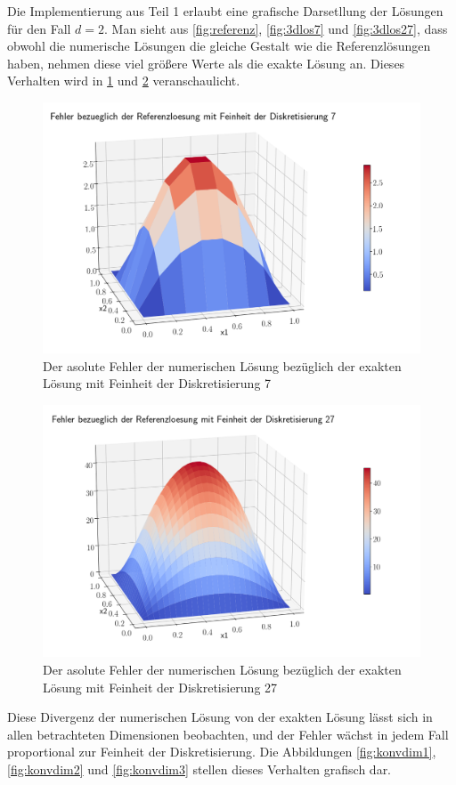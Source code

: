 \documentclass[smallheadings]{scrartcl}
\numberwithin{equation}{section}
\begin{document}
Die Implementierung aus Teil 1 erlaubt eine grafische Darsetllung der Lösungen für den Fall $d=2$. Man sieht aus \ref{fig:referenz}, \ref{fig:3dlos7} und \ref{fig:3dlos27}, dass obwohl die numerische Lösungen die gleiche Gestalt wie die Referenzlösungen haben, nehmen diese viel größere Werte als die exakte Lösung an. Dieses Verhalten wird in \ref{fig:3dfel7} und \ref{fig:3dfel27} veranschaulicht. 

\begin{figure}
	\centering
	\includegraphics[width=0.7\linewidth]{Bericht/Bilder/3dfeh7}
	\caption{Der asolute Fehler der numerischen Lösung bezüglich der exakten Lösung mit Feinheit der Diskretisierung 7}
	\label{fig:3dfel7}
\end{figure}

\begin{figure}
	\centering
	\includegraphics[width=0.7\linewidth]{Bericht/Bilder/3dfel27}
	\caption{Der asolute Fehler der numerischen Lösung bezüglich der exakten Lösung mit Feinheit der Diskretisierung 27}
	\label{fig:3dfel27}
\end{figure}

Diese Divergenz der numerischen Lösung von der exakten Lösung lässt sich in allen betrachteten Dimensionen beobachten, und der Fehler wächst in jedem Fall proportional zur Feinheit der Diskretisierung. Die Abbildungen \ref{fig:konvdim1}, \ref{fig:konvdim2} und \ref{fig:konvdim3} stellen dieses Verhalten grafisch dar.
\end{document}
